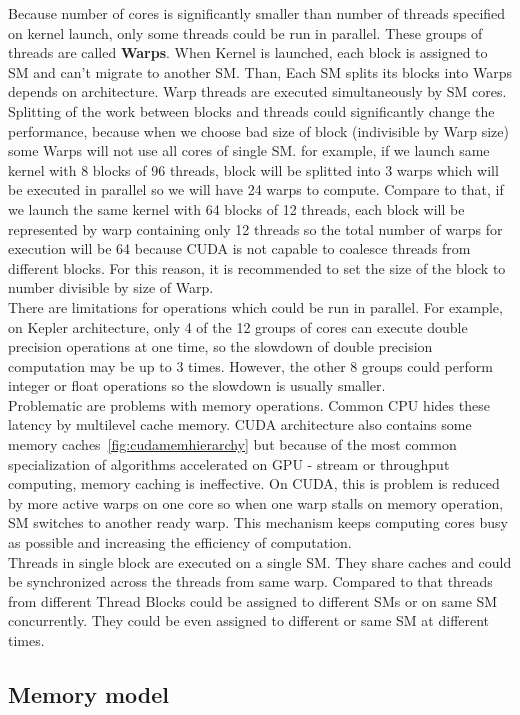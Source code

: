 Because number of cores is significantly smaller than number of threads specified on kernel launch, only some threads could be run in parallel. These groups of threads are called \textbf{Warps}. When Kernel is launched, each block is assigned to SM and can't migrate to another SM. Than, Each SM splits its blocks into Warps depends on architecture. Warp threads are executed simultaneously by SM cores. Splitting of the work between blocks and threads could significantly change the performance, because when we choose bad size of block (indivisible by Warp size) some Warps will not use all cores of single SM. for example, if we launch same kernel with 8 blocks of 96 threads, block will be splitted into 3 warps which will be executed in parallel so we will have 24 warps to compute. Compare to that, if we launch the same kernel with 64 blocks of 12 threads, each block will be represented by warp containing only 12 threads so the total number of warps for execution will be 64 because CUDA is not capable to coalesce threads from different blocks. For this reason, it is recommended to set the size of the block to number divisible by size of Warp.\\
There are limitations for operations which could be run in parallel. For example, on Kepler architecture, only 4 of the 12 groups of cores can execute double precision operations at one time, so the slowdown of double precision computation may be up to 3 times. However, the other 8 groups could perform integer or float operations so the slowdown is usually smaller.\\
Problematic are problems with memory operations. Common CPU hides these latency by multilevel cache memory. CUDA architecture also contains some memory caches~\ref{fig:cudamemhierarchy} but because of the most common specialization of algorithms accelerated on GPU - stream or throughput computing, memory caching is ineffective. On CUDA, this is problem is reduced by more active warps on one core so when one warp stalls on memory operation, SM switches to another ready warp. This mechanism keeps computing cores busy as possible and increasing the efficiency of computation.\\
Threads in single block are executed on a single SM. They share caches and could be synchronized across the threads from same warp. Compared to that threads from different Thread Blocks could be assigned to different SMs or on same SM concurrently. They could be even assigned to different or same SM at different times.


\subsection{Memory model}


